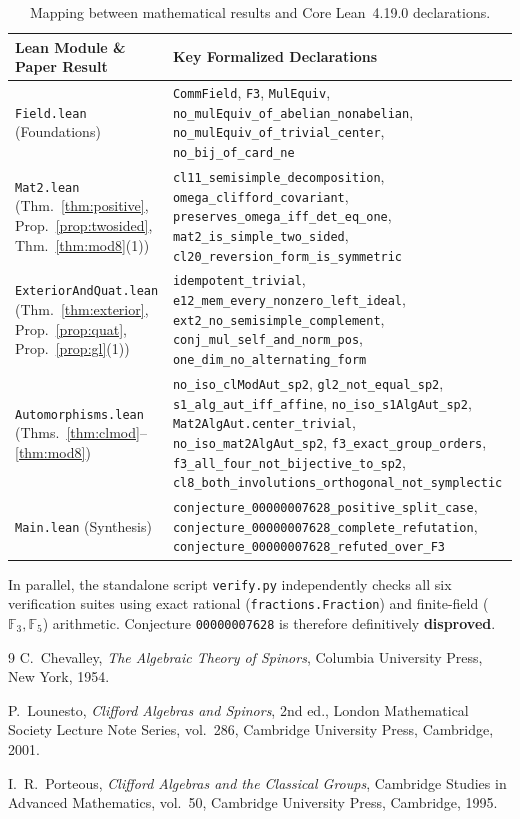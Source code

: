 \documentclass[11pt,a4paper]{article}
\theoremstyle{definition}
\begin{document}
\begin{table}[ht]
\centering
\footnotesize
\renewcommand{\arraystretch}{1.2}
\caption{Mapping between mathematical results and Core Lean~4.19.0 declarations.}
\vspace{4pt}
\label{tab:lean}
\begin{tabular}{@{}>{\raggedright\arraybackslash}p{}>{\raggedright\arraybackslash}p{}@{}}
\hline
\textbf{Lean Module \& Paper Result} & \textbf{Key Formalized Declarations} \\
\hline
\texttt{Field.lean} (Foundations) & \texttt{CommField}, \texttt{F3}, \texttt{MulEquiv}, \texttt{no\_mulEquiv\_of\_abelian\_nonabelian}, \texttt{no\_mulEquiv\_of\_trivial\_center}, \texttt{no\_bij\_of\_card\_ne} \\
\texttt{Mat2.lean} (Thm.~\ref{thm:positive}, Prop.~\ref{prop:twosided}, Thm.~\ref{thm:mod8}(1)) & \texttt{cl11\_semisimple\_decomposition}, \texttt{omega\_clifford\_covariant}, \texttt{preserves\_omega\_iff\_det\_eq\_one}, \texttt{mat2\_is\_simple\_two\_sided}, \texttt{cl20\_reversion\_form\_is\_symmetric} \\
\texttt{ExteriorAndQuat.lean} (Thm.~\ref{thm:exterior}, Prop.~\ref{prop:quat}, Prop.~\ref{prop:gl}(1)) & \texttt{idempotent\_trivial}, \texttt{e12\_mem\_every\_nonzero\_left\_ideal}, \texttt{ext2\_no\_semisimple\_complement}, \texttt{conj\_mul\_self\_and\_norm\_pos}, \texttt{one\_dim\_no\_alternating\_form} \\
\texttt{Automorphisms.lean} (Thms.~\ref{thm:clmod}--\ref{thm:mod8}) & \texttt{no\_iso\_clModAut\_sp2}, \texttt{gl2\_not\_equal\_sp2}, \texttt{s1\_alg\_aut\_iff\_affine}, \texttt{no\_iso\_s1AlgAut\_sp2}, \texttt{Mat2AlgAut.center\_trivial}, \texttt{no\_iso\_mat2AlgAut\_sp2}, \texttt{f3\_exact\_group\_orders}, \texttt{f3\_all\_four\_not\_bijective\_to\_sp2}, \texttt{cl8\_both\_involutions\_orthogonal\_not\_symplectic} \\
\texttt{Main.lean} (Synthesis) & \texttt{conjecture\_00000007628\_positive\_split\_case}, \texttt{conjecture\_00000007628\_complete\_refutation}, \texttt{conjecture\_00000007628\_refuted\_over\_F3} \\
\hline
\end{tabular}
\end{table}
In parallel, the standalone script \texttt{verify.py} independently checks all six verification suites using exact rational (\texttt{fractions.Fraction}) and finite-field ($\mathbb{F}_3, \mathbb{F}_5$) arithmetic. Conjecture \texttt{00000007628} is therefore definitively \textbf{disproved}.

\begin{thebibliography}{9}
C.~Chevalley, \emph{The Algebraic Theory of Spinors}, Columbia University Press, New York, 1954.

P.~Lounesto, \emph{Clifford Algebras and Spinors}, 2nd ed., London Mathematical Society Lecture Note Series, vol.~286, Cambridge University Press, Cambridge, 2001.

I.~R.~Porteous, \emph{Clifford Algebras and the Classical Groups}, Cambridge Studies in Advanced Mathematics, vol.~50, Cambridge University Press, Cambridge, 1995.
\end{thebibliography}
\end{document}
